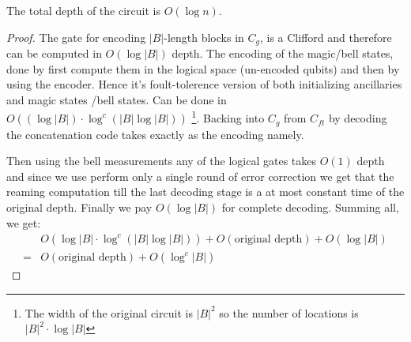 \documentclass[manuscript,screen,review]{acmart}
\begin{document}
\begin{claim}
  The total depth of the circuit is $O\left( \log n  \right)$. 
\end{claim}
\begin{proof}
  The gate for encoding $|B|$-length blocks in $C_{g}$, is a Clifford and therefore can be computed in $O(\log|B|)$ depth. The encoding of the magic/bell states, done by first compute them in the logical space (un-encoded qubits) and then by using the encoder. Hence it's foult-tolerence version of both initializing ancillaries and magic states /bell states. Can be done in $O( (\log |B|) \cdot \log^{c}( |B| \log |B| ) )$ \footnote{The width of the original circuit is $|B|^{2}$ so the number of locations is $ |B|^{2} \cdot \log |B|$}. Backing into $C_{g}$ from $C_{ft}$ by decoding the concatenation code takes exactly as the encoding namely. 

  Then using the bell measurements any of the logical gates takes $O(1)$ depth and since we use perform only a single round of error correction we get that the reaming computation till the last decoding stage is a at most constant time of the original depth. Finally we pay $O(\log |B|)$ for complete decoding. Summing all, we get: 
  \begin{equation*}
    \begin{split}
     &  O ( \log |B|\cdot  \log^{c}( |B| \log |B| ) )  + O ( \text{original depth} ) + O ( \log |B| ) \\ 
     = & O ( \text{original depth} ) + O ( \log^{c} |B| )
    \end{split}
  \end{equation*}
\end{proof}






%
\printbibliography
\end{document}
